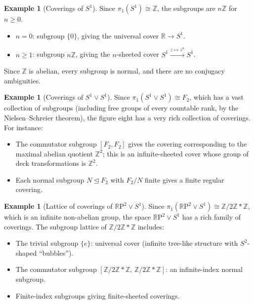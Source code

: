 \documentclass[12pt,a4paper,openany]{book}
\theoremstyle{definition}
\newtheorem{example}[definition]{Example}
\theoremstyle{plain}
\theoremstyle{remark}
\newcommand{\Z}{\mathbb{Z}}
\newcommand{\R}{\mathbb{R}}
\newcommand{\RP}{\mathbb{R}\mathrm{P}}
\begin{document}
\begin{example}[Coverings of $S^1$]\label{ex:coverings-S1-classification}
  Since $\pi_1(S^1) \cong \Z$, the subgroups are $n\Z$ for $n \geq 0$.
  \begin{itemize}
    \item $n = 0$: subgroup $\{0\}$, giving the universal cover
      $\R \to S^1$.
    \item $n \geq 1$: subgroup $n\Z$, giving the $n$-sheeted cover
      $S^1 \xrightarrow{z \mapsto z^n} S^1$.
  \end{itemize}
  Since $\Z$ is abelian, every subgroup is normal, and there are no conjugacy
  ambiguities.
\end{example}

\begin{example}[Coverings of $S^1 \vee S^1$]\label{ex:coverings-bouquet}
  Since $\pi_1(S^1 \vee S^1) \cong F_2$, which has a vast collection of
  subgroups (including free groups of every countable rank, by the
  Nielsen--Schreier theorem), the figure
  eight has a very rich collection of coverings.  For instance:
  \begin{itemize}
    \item The commutator subgroup $[F_2, F_2]$ gives the covering
      corresponding to the maximal abelian quotient $\Z^2$; this is an
      infinite-sheeted cover whose group of deck transformations is $\Z^2$.
    \item Each normal subgroup $N \trianglelefteq F_2$ with $F_2/N$ finite
      gives a finite regular covering.
  \end{itemize}
\end{example}

\begin{example}[Lattice of coverings of $\RP^2 \vee S^1$]\label{ex:coverings-RP2-wedge}
  Since $\pi_1(\RP^2 \vee S^1) \cong \Z/2\Z * \Z$, which is an infinite
  non-abelian group, the space $\RP^2 \vee S^1$ has a rich family of
  coverings.  The subgroup lattice of $\Z/2\Z * \Z$ includes:
  \begin{itemize}
    \item The trivial subgroup $\{e\}$: universal cover (infinite tree-like
      structure with $S^2$-shaped ``bubbles'').
    \item The commutator subgroup $[\Z/2\Z * \Z,\, \Z/2\Z * \Z]$: an
      infinite-index normal subgroup.
    \item Finite-index subgroups giving finite-sheeted coverings.
  \end{itemize}
\end{example}
\end{document}
